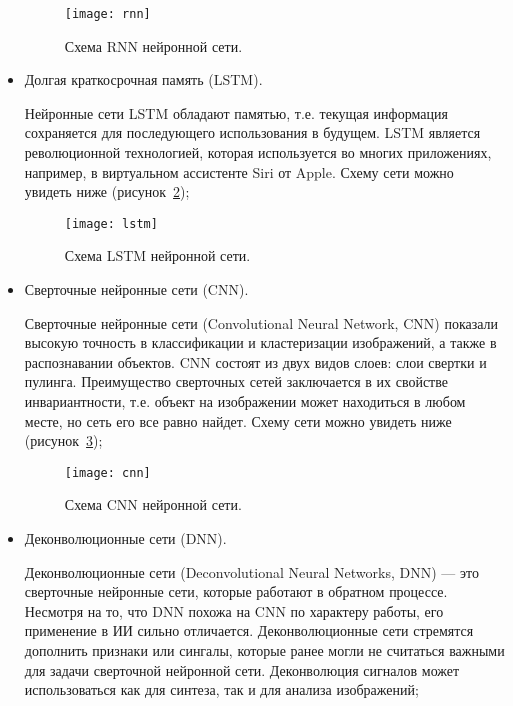 \documentclass{article}
\begin{document}
\begin{itemize}
		\begin{figure}[H]
			\begin{center}
				\texttt{[image: rnn]}
				\caption{Схема RNN нейронной сети.} 
				\label{rnn}
			\end{center}
		\end{figure}
	
		\item Долгая краткосрочная память (LSTM).
	
		Нейронные сети LSTM обладают памятью, т.е. текущая информация сохраняется для последующего использования в будущем. LSTM является революционной технологией, которая используется во многих приложениях, например, в виртуальном ассистенте Siri от Apple.  Схему сети можно увидеть ниже (рисунок~\ref{lstm});
	
		\begin{figure}[H]
			\begin{center}
				\texttt{[image: lstm]}
				\caption{Схема LSTM нейронной сети.} 
				\label{lstm}
			\end{center}
		\end{figure}
	
		\item Сверточные нейронные сети (CNN).
	
		Сверточные нейронные сети (Convolutional Neural Network, CNN) показали высокую точность в классификации и кластеризации изображений, а также в распознавании объектов. CNN состоят из двух видов слоев: слои свертки и пулинга. Преимущество сверточных сетей заключается в их свойстве инвариантности, т.е. объект на изображении может находиться в любом месте, но сеть его все равно найдет.  Схему сети можно увидеть ниже (рисунок~\ref{cnn});
	
		\begin{figure}[H]
			\begin{center}
				\texttt{[image: cnn]}
				\caption{Схема CNN нейронной сети.} 
				\label{cnn}
			\end{center}
		\end{figure}
	
		\item Деконволюционные сети (DNN).
	
		Деконволюционные сети (Deconvolutional Neural Networks, DNN) — это сверточные нейронные сети, которые работают в обратном процессе. Несмотря на то, что DNN похожа на CNN по характеру работы, его применение в ИИ сильно отличается. Деконволюционные сети стремятся дополнить признаки или сингалы, которые ранее могли не считаться важными для задачи сверточной нейронной сети. Деконволюция сигналов может использоваться как для синтеза, так и для анализа изображений;
	

\end{itemize}
\end{document}
